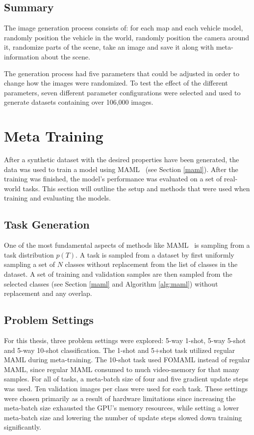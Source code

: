 \subsection{Summary}
The image generation process consists of: for each map and each vehicle model, randomly position the vehicle in the world, randomly position the camera around it, randomize parts of the scene, take an image and save it along with meta-information about the scene. 

The generation process had five parameters that could be adjusted in order to change how the images were randomized. To test the effect of the different parameters, seven different parameter configurations were selected and used to generate datasets containing over 106,000 images.

\section{Meta Training}\label{meta-section}
After a synthetic dataset with the desired properties have been generated, the data was used to train a model using \gls{MAML}~\cite{maml} (see Section \ref{maml}). After the training was finished, the model's performance was evaluated on a set of real-world tasks. This section will outline the setup and methods that were used when training and evaluating the models.

\subsection{Task Generation}\label{task-generation}
One of the most fundamental aspects of methods like \gls{MAML}~\cite{maml} is sampling from a task distribution $p(T)$. A task is sampled from a dataset by first uniformly sampling a set of $N$ classes without replacement from the list of classes in the dataset. A set of training and validation samples are then sampled from the selected classes (see Section \ref{maml} and Algorithm \ref{alg:maml}) without replacement and any overlap.

\subsection{Problem Settings}
For this thesis, three problem settings were explored: 5-way 1-shot, 5-way 5-shot and 5-way 10-shot classification. The 1-shot and 5+shot task utilized regular \gls{MAML} during meta-training. The 10-shot task used \gls{FOMAML} instead of regular \gls{MAML}, since regular \gls{MAML} consumed to much video-memory for that many samples. For all of tasks, a meta-batch size of four and five gradient update steps was used. Ten validation images per class were used for each task. These settings were chosen primarily as a result of hardware limitations since increasing the meta-batch size exhausted the GPU's memory resources, while setting a lower meta-batch size and lowering the number of update steps slowed down training significantly.

